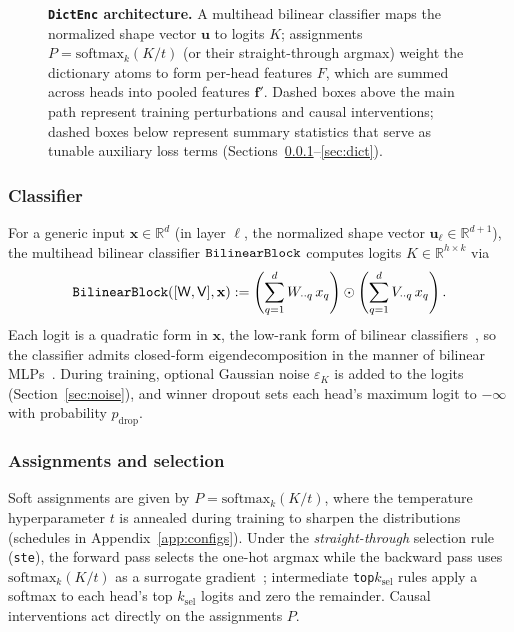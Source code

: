 

\begin{figure}[tp]
\centering
\resizebox{\linewidth}{!}{}
\caption[\texttt{DictEnc} architecture]{\textbf{\texttt{DictEnc} architecture.}
	A multihead bilinear classifier maps the normalized shape vector
	$\mathbf{u}$ to logits $K$; assignments $P = \mathrm{softmax}_k(K/t)$
	(or their straight-through argmax) weight the dictionary atoms to form
	per-head features $F$, which are summed across heads into pooled features
	$\mathbf{f}'$. Dashed boxes above the main path represent training
	perturbations and causal interventions; dashed boxes below represent
	summary statistics that serve as tunable auxiliary loss terms
	(Sections~\ref{sec:bilinear}--\ref{sec:dict}).}
\label{fig:dictenc}
\end{figure}

\subsubsection{Classifier}
\label{sec:bilinear}
For a generic input $\mathbf{x} \in \mathbb{R}^d$ (in layer $\ell$, the
normalized shape vector $\mathbf{u}_\ell \in \mathbb{R}^{d+1}$), the
multihead bilinear classifier $\mathop{\mathtt{BilinearBlock}}\limits$ computes logits
$K \in \mathbb{R}^{h \times k}$ via
\begin{equation}
	\mathop{\mathtt{BilinearBlock}}\limits([\mathsf{W},\mathsf{V}],\mathbf{x}) :=
	\left(\sum^{d}_{q=1}W_{\cdot\cdot q}\,x_q\right)
	 \odot \left(\sum^{d}_{q=1}V_{\cdot\cdot q}\,x_q\right).
	 \label{eq:bilinearblock}
\end{equation}
Each logit is a quadratic form in $\mathbf{x}$, the low-rank form of
bilinear classifiers~\cite{pirsiavash2009,kim2017}, so the classifier
admits closed-form eigendecomposition in the manner of bilinear
MLPs~\cite{pearce2025}. During training, optional Gaussian noise
$\varepsilon_K$ is added to the logits (Section~\ref{sec:noise}), and
winner dropout sets each head's maximum logit to $-\infty$ with
probability $p_{\mathrm{drop}}$.

\subsubsection{Assignments and selection}
\label{sec:labels}
Soft assignments are given by $P = \mathrm{softmax}_{k}(K/t)$, where the
temperature hyperparameter $t$ is annealed during training to sharpen the
distributions (schedules in Appendix~\ref{app:configs}). Under the
\emph{straight-through} selection rule (\texttt{ste}), the forward pass
selects the one-hot argmax while the backward pass uses
$\mathrm{softmax}_k(K/t)$ as a surrogate gradient~\cite{bengio2013,jang2017};
intermediate \texttt{top}$k_{\mathrm{sel}}$ rules apply a softmax to each
head's top $k_{\mathrm{sel}}$ logits and zero the remainder. Causal
interventions act directly on the assignments $P$.

